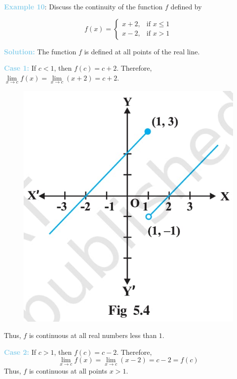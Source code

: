 \documentclass[a4paper,12pt]{article}
\begin{document}
    \noindent \textbf{\textcolor{skyblue}{Example 10}}: Discuss the continuity of the function $f$ defined by

    \[
    f(x) =
    \begin{cases} 
    x+2, & \text{if } x \leq 1 \\ 
    x-2, & \text{if } x > 1 
    \end{cases}
    \]

    \noindent \textbf{\textcolor{skyblue}{Solution:}} The function $f$ is defined at all points of the real line.

    \vspace{8pt}

    \noindent \textbf{\textcolor{skyblue}{Case 1:}} If $c < 1$, then $f(c) = c + 2$. Therefore, $\lim\limits_{x \to c} f(x) = \lim\limits_{x \to c} (x + 2) = c + 2$.

    \begin{figure}
    \centering
    \includegraphics[width=1\linewidth]{a.jpg}
    \end{figure}
    \noindent Thus, $f$ is continuous at all real numbers less than $1$.
     
    \vspace{4pt}
    \noindent\textbf{\textcolor{skyblue}{Case 2:}} If $c > 1$, then $f(c) = c - 2$. Therefore,
    \[
    \lim\limits_{x \to c} f(x) = \lim\limits_{x \to c} (x - 2) = c - 2 = f(c)
    \]
    Thus, $f$ is continuous at all points $x > 1$.
    \vspace{4pt}
    
\end{document}
